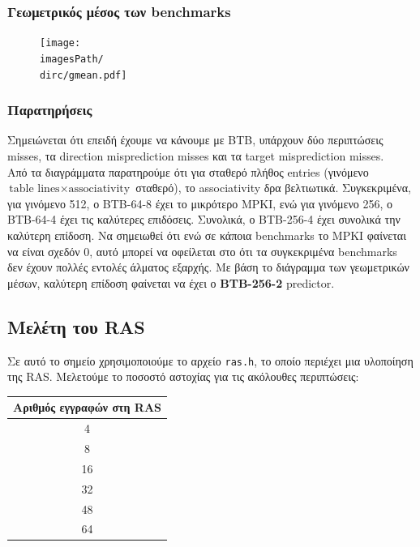 \documentclass[12pt,a4paper]{article}
\newcommand{\imagesPath}{/home/nick/arch-ntua/ex02/graphs}
\newcommand{\dirc}{4.3}
\begin{document}
			\subsubsection{Γεωμετρικός μέσος των benchmarks}
			
				\begin{figure}[H]
					\begin{center}
						\texttt{[image: \\imagesPath/\\dirc/gmean.pdf]}
					\end{center}
				\end{figure}
				
			\subsubsection{Παρατηρήσεις}
				Σημειώνεται ότι επειδή έχουμε να κάνουμε με BTB, υπάρχουν δύο περιπτώσεις misses, τα direction misprediction misses και τα target misprediction misses. \\
				
				Από τα διαγράμματα παρατηρούμε ότι για σταθερό πλήθος entries (γινόμενο ${\text{table lines} \times \text{associativity}}$ σταθερό), το associativity δρα βελτιωτικά. Συγκεκριμένα, για γινόμενο 512, ο BTB-64-8 έχει το μικρότερο MPKI, ενώ για γινόμενο 256, ο BTB-64-4 έχει τις καλύτερες επιδόσεις. Συνολικά, ο BTB-256-4 έχει συνολικά την καλύτερη επίδοση. Να σημειωθεί ότι ενώ σε κάποια benchmarks το MPKI φαίνεται να είναι σχεδόν 0, αυτό μπορεί να οφείλεται στο ότι τα συγκεκριμένα benchmarks δεν έχουν πολλές εντολές άλματος εξαρχής. Με βάση το διάγραμμα των γεωμετρικών μέσων, καλύτερη επίδοση φαίνεται να έχει ο \textbf{BTB-256-2} predictor.
				
		
		\subsection{Μελέτη του RAS}
			Σε αυτό το σημείο χρησιμοποιούμε το αρχείο \verb|ras.h|, το οποίο περιέχει μια υλοποίηση της RAS. Μελετούμε το ποσοστό αστοχίας για τις ακόλουθες περιπτώσεις:
			
			\begin{center}
				\begin{tabular}{|c|}
					\hline
					\textbf{Αριθμός εγγραφών στη RAS} \\ \hline
					4 \\ \hline
					8 \\ \hline
					16 \\ \hline
					32 \\ \hline
					48 \\ \hline
					64 \\ \hline
				\end{tabular}
			\end{center}
		
\end{document}
